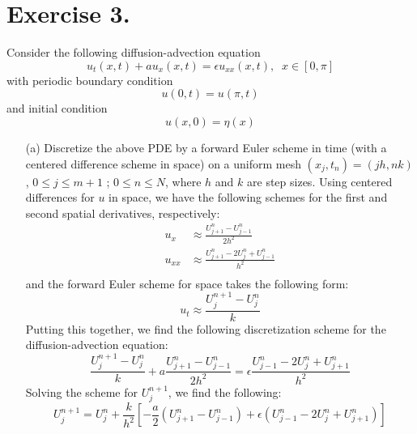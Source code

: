 \documentclass{article}
\begin{document}
\section*{Exercise 3.}
Consider the following diffusion-advection equation
\[u_t(x,t) + au_x(x,t) = \epsilon u_{xx}(x,t), \;\; x \in [0, \pi]\]
with periodic boundary condition
\[u(0,t) = u(\pi,t)\]
and initial condition
\[u(x,0) = \eta(x)\]
\begin{itemize}
    \item[(a)] Discretize the above PDE by a forward Euler scheme in time (with a centered difference scheme in space) on a uniform mesh $(x_j, t_n) = (jh,nk)$, $0 \leq j \leq m + 1$ ; $0 \leq n \leq N$, where $h$ and $k$ are step sizes.
    \newline\newline
    Using centered differences for $u$ in space, we have the following schemes for the first and second spatial derivatives, respectively:
    \begin{align*}
        u_x &\approx \frac{U^n_{j+1} - U^n_{j-1}}{2h^2} \\
        u_{xx} &\approx \frac{U^n_{j+1} - 2U_j^n + U^n_{j-1}}{h^2} \\
    \end{align*}
    and the forward Euler scheme for space takes the following form:
    \[u_t \approx \frac{U^{n+1}_j - U^n_j}{k}\]
    Putting this together, we find the following discretization scheme for the diffusion-advection equation:
    \[\frac{U_j^{n+1} - U_j^n}{k} + a\frac{U_{j+1}^n - U_{j-1}^n}{2h^2} = \epsilon\frac{U_{j-1}^n - 2U_j^n + U^n_{j+1}}{h^2}\]
    Solving the scheme for $U_j^{n+1}$, we find the following:
    \[U_j^{n+1} = U_j^n + \frac{k}{h^2}\left[-\frac{a}{2}(U_{j+1}^n - U_{j-1}^n) + \epsilon(U_{j-1}^n - 2U_j^n + U_{j+1}^n)\right]\]


\end{itemize}
\end{document}
